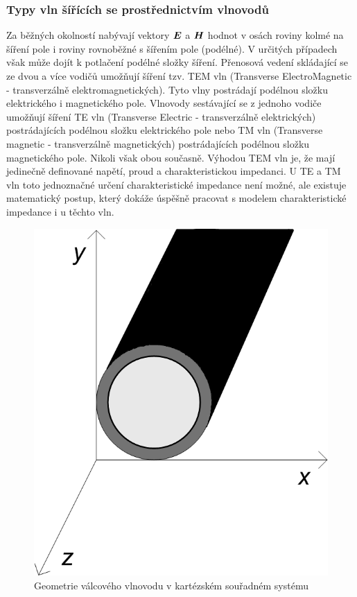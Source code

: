 \documentclass[12pt,a4paper,oneside]{article}
\numberwithin{equation}{section} %
\numberwithin{figure}{section} %
\numberwithin{table}{section} %
\renewcommand{\vec}[1]{\mbox{\boldmath$#1$}} %
\begin{document}
\subsubsection{Typy vln šířících se prostřednictvím vlnovodů}
Za běžných okolností nabývají vektory $\vec{E}$ a $\vec{H}$ hodnot v osách roviny kolmé na šíření pole i roviny rovnoběžné s šířením pole (podélné). V určitých případech však může dojít k potlačení podélné složky šíření. Přenosová vedení skládající se ze dvou a více vodičů umožňují šíření tzv. TEM vln (Transverse ElectroMagnetic - transverzálně elektromagnetických). Tyto vlny postrádají podélnou složku elektrického i magnetického pole. Vlnovody sestávající se z jednoho vodiče umožňují šíření TE vln (Transverse Electric - transverzálně elektrických) postrádajících podélnou složku elektrického pole nebo TM vln (Transverse magnetic - transverzálně magnetických) postrádajících podélnou složku magnetického pole. Nikoli však obou současně. Výhodou TEM vln je, že mají jedinečně definované napětí, proud a charakteristickou impedanci. U TE a TM vln toto jednoznačné určení charakteristické impedance není možné, ale existuje matematický postup, který dokáže úspěšně pracovat s modelem charakteristické impedance i u těchto vln.

\begin{figure} 
\begin{center}
\includegraphics{geometrie.png}
\caption{Geometrie válcového vlnovodu v kartézském souřadném systému}
\label{geometrie}
\end{center}
\end{figure}
\end{document}
